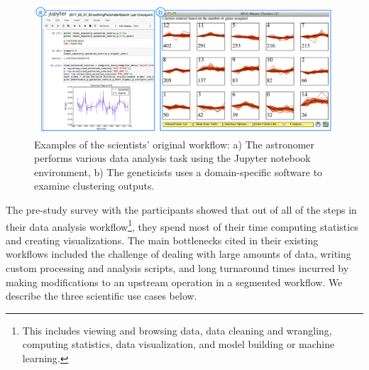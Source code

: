 \begin{figure}[!h]
  \centering
  \includegraphics[width=\linewidth]{figures/workflow.png}
  \caption{Examples of the scientists' original workflow: a) The astronomer performs various data analysis task using the Jupyter notebook environment, b) The geneticists uses a domain-specific software to examine clustering outputs.}
  \label{workflow}
\end{figure}

\noindent The pre-study survey with the participants showed that out of all of the steps in their data analysis workflow\footnote{This includes viewing and browsing data, data cleaning and wrangling, computing statistics, data visualization, and model building or machine learning.}, they spend most of their time computing statistics and creating visualizations.
The main bottlenecks cited in their existing workflows included the challenge of dealing with large amounts of data, writing custom processing and analysis scripts, and long turnaround times incurred by making modifications to an upstream operation in a segmented workflow. %
 We  describe the three scientific use cases below.
